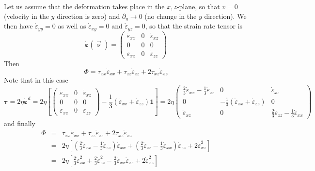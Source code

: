 \documentclass[a4paper,11pt]{article}
\newcommand{\nn}{\nonumber}
\begin{document}
Let us assume that the deformation takes place in the $x,z$-plane,
so that $v=0$ (velocity in the $y$ direction is zero) and $\partial_y \rightarrow 0$ 
(no change in the $y$ direction).
We then have $\dot{\varepsilon}_{yy}=0$ as well as $\dot{\varepsilon}_{xy}=0$ 
and $\dot{\varepsilon}_{yz}=0$, so that the strain rate tensor is  
\[
\dot{\bm \varepsilon}(\vec\upnu)=
\left( \begin{array}{ccc}
\dot{\varepsilon}_{xx} & 0 & \dot{\varepsilon}_{xz}  \\
0 & 0 & 0 \\
\dot{\varepsilon}_{xz} & 0 & \dot{\varepsilon}_{zz}  
\end{array}\right)
\]
Then 
\[
\Phi = 
\tau_{xx} \dot{\varepsilon}_{xx} +
\tau_{zz} \dot{\varepsilon}_{zz} +
2\tau_{xz} \dot{\varepsilon}_{xz} 
\]
Note that in this case
\[
{\bm \tau}= 2\eta \dot{\bm \varepsilon}^d =
2 \eta 
\left[
\left( \begin{array}{ccc}
\dot{\varepsilon}_{xx} & 0 & \dot{\varepsilon}_{xz}  \\
0 & 0 & 0 \\
\dot{\varepsilon}_{xz} & 0 & \dot{\varepsilon}_{zz}  
\end{array}\right)
-\frac13 ( \dot{\varepsilon}_{xx} + \dot{\varepsilon}_{zz} ) {\bm 1} \right]
=2\eta 
\left( \begin{array}{ccc}
\frac23 \dot{\varepsilon}_{xx} - \frac13 \dot{\varepsilon}_{zz} & 0 & \dot{\varepsilon}_{xz}  \\
0 & -\frac13 ( \dot{\varepsilon}_{xx} + \dot{\varepsilon}_{zz} ) & 0 \\
\dot{\varepsilon}_{xz} & 0 & \frac23 \dot{\varepsilon}_{zz}  - \frac13 \dot{\varepsilon}_{xx} 
\end{array}\right)
\]
and finally
\begin{eqnarray}
\Phi 
&=& \tau_{xx} \dot{\varepsilon}_{xx} +
\tau_{zz} \dot{\varepsilon}_{zz} +
2\tau_{xz} \dot{\varepsilon}_{xz} \nn\\
&=& 
2\eta \left[ 
(\frac23 \dot{\varepsilon}_{xx} - \frac13 \dot{\varepsilon}_{zz} ) \dot{\varepsilon}_{xx} 
+(\frac23 \dot{\varepsilon}_{zz}  - \frac13 \dot{\varepsilon}_{xx} ) \dot{\varepsilon}_{zz}
+2 \dot{\varepsilon}_{xz} ^2 
\right] \nn\\
&=&
2\eta \left[ 
\frac23 \dot{\varepsilon}_{xx}^2 
+\frac23 \dot{\varepsilon}_{zz}^2  
-\frac23 \dot{\varepsilon}_{xx} \dot{\varepsilon}_{zz}
+2 \dot{\varepsilon}_{xz} ^2 
\right] 
\end{eqnarray}


\end{document}
